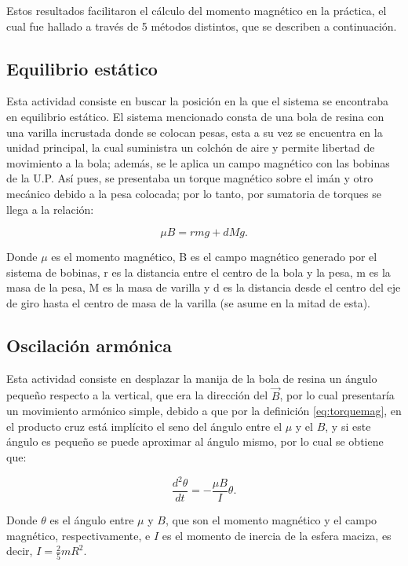\documentclass[%
 reprint,
 amsmath,amssymb,
 aps,
]{revtex4-1}
\begin{document}
Estos resultados facilitaron el cálculo del momento magnético en la práctica, el cual fue hallado a través de 5 métodos distintos, que se describen a continuación.

\subsection{Equilibrio estático}

Esta actividad consiste en buscar la posición en la que el sistema se encontraba en equilibrio estático. El sistema mencionado consta de una bola de resina con una varilla incrustada donde se colocan pesas, esta a su vez se encuentra en la unidad principal, la cual suministra un colchón de aire y permite libertad de movimiento a la bola; además, se le aplica un campo magnético con las bobinas de la U.P. Así pues, se presentaba un torque magnético sobre el imán y otro mecánico debido a la pesa colocada; por lo tanto, por sumatoria de torques se llega a la relación:

\begin{equation}
    \mu B = rmg + dMg.
    \label{eq:torques}
\end{equation}

Donde $\mu$ es el momento magnético, B es el campo magnético generado por el sistema de bobinas, r es la distancia entre el centro de la bola y la pesa, m es la masa de la pesa, M es la masa de varilla y d es la distancia desde el centro del eje de giro hasta el centro de masa de la varilla (se asume en la mitad de esta).

\subsection{Oscilación armónica}

Esta actividad consiste en desplazar la manija de la bola de resina un ángulo pequeño respecto a la vertical, que era la dirección del $\vec{B}$, por lo cual presentaría un movimiento armónico simple, debido a que por la definición \ref{eq:torquemag}, en el producto cruz está implícito el seno del ángulo entre el $\mu$ y el $B$, y si este ángulo es pequeño se puede aproximar al ángulo mismo, por lo cual se obtiene que:

\begin{equation}
    \frac{d^2 \theta}{dt} = - \frac{\mu B}{I} \theta.
    \label{movarmonico}
\end{equation}

Donde $\theta$ es el ángulo entre $\mu$ y $B$, que son el momento magnético y el campo magnético, respectivamente, e $I$ es el momento de inercia de la esfera maciza, es decir, $I=\frac{2}{5}mR^2$.
\end{document}
